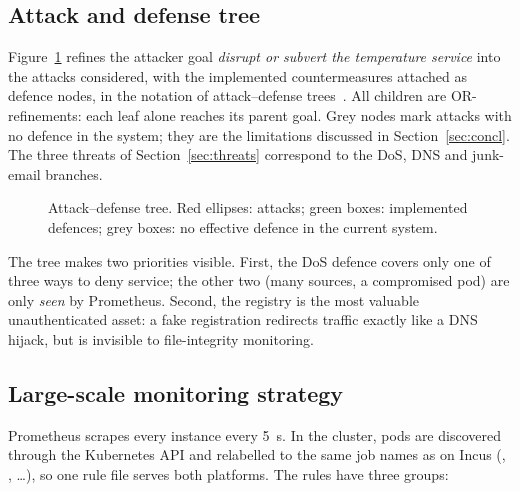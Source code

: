 \subsection{Attack and defense tree}

Figure~\ref{fig:adtree} refines the attacker goal \emph{disrupt or subvert the temperature service}
into the attacks considered, with the implemented countermeasures attached as defence nodes, in the notation
of attack--defense trees~\cite{kordy2010adtrees}. All children are OR-refinements: each leaf alone
reaches its parent goal. Grey nodes mark attacks with no defence in the system; they are the
limitations discussed in Section~\ref{sec:concl}. The three threats of Section~\ref{sec:threats}
correspond to the DoS, DNS and junk-email branches.

\begin{figure}[ht]
\centering
\resizebox{\textwidth}{!}{}
\caption{Attack--defense tree. Red ellipses: attacks; green boxes: implemented defences; grey boxes:
no effective defence in the current system.}
\label{fig:adtree}
\end{figure}

The tree makes two priorities visible. First, the DoS defence covers only one of three ways to deny
service; the other two (many sources, a compromised pod) are only \emph{seen} by Prometheus.
Second, the registry is the most valuable unauthenticated asset: a fake registration redirects
traffic exactly like a DNS hijack, but is invisible to file-integrity monitoring.

\subsection{Large-scale monitoring strategy}

Prometheus scrapes every instance every 5~s. In the cluster, pods are discovered through the
Kubernetes API and relabelled to the same job names as on Incus (,
, \dots), so one rule file serves both platforms. The rules have three groups:

